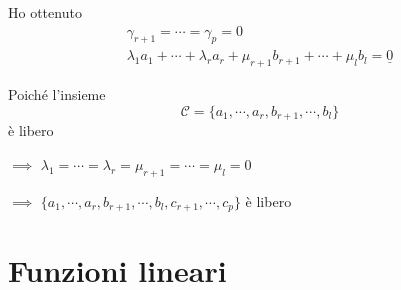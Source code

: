\documentclass[twoside, 11pt, titlepage]{article}
\begin{document}
\begin{enumerate}
    Ho ottenuto
    \begin{gather*}
    \gamma_{r+1}=\cdots=\gamma_p=0\\
    \lambda_1a_1+ \cdots + \lambda_r a_r + \mu_{r+1} b_{r+1} + \cdots + \mu_l b_l=\underline{0}
    \end{gather*}
     
    Poiché l'insieme \[\mathscr{C}=\{a_1, \cdots, a_r, b_{r+1}, \cdots, b_l\}\] è libero
    
    $\implies$ $\lambda_1=\cdots=\lambda_r = \mu_{r+1}=\cdots=\mu_l=0$
    
    $\implies$ $\{a_1, \cdots, a_r, b_{r+1}, \cdots, b_l, c_{r+1}, \cdots, c_p\}$ è libero
\end{enumerate}%



\section{Funzioni lineari}
\end{document}
